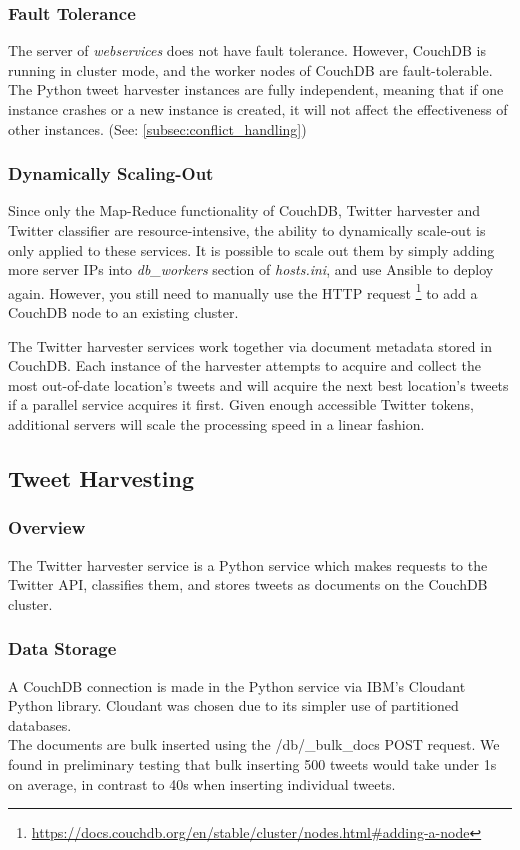 \documentclass[parskip=full, 11pt]{article}
\begin{document}
\subsubsection{Fault Tolerance}
The server of \emph{webservices} does not have fault tolerance. However, CouchDB is running in cluster mode, and the worker nodes of CouchDB are fault-tolerable. The Python tweet harvester instances are fully independent, meaning that if one instance crashes or a new instance is created, it will not affect the effectiveness of other instances. (See: \ref{subsec:conflict_handling})

\subsubsection{Dynamically Scaling-Out}

Since only the Map-Reduce functionality of CouchDB, Twitter harvester and Twitter classifier are resource-intensive, the ability to dynamically scale-out is only applied to these services. It is possible to scale out them by simply adding more server IPs into \emph{db\_workers} section of \emph{hosts.ini}, and use Ansible to deploy again. However, you still need to manually use the HTTP request \footnote{\url{https://docs.couchdb.org/en/stable/cluster/nodes.html\#adding-a-node}} to add a CouchDB node to an existing cluster.

The Twitter harvester services work together via document metadata stored in CouchDB. Each instance of the harvester attempts to acquire and collect the most out-of-date location's tweets and will acquire the next best location's tweets if a parallel service acquires it first. Given enough accessible Twitter tokens, additional servers will scale the processing speed in a linear fashion.

\subsection{Tweet Harvesting}

\subsubsection{Overview}
The Twitter harvester service is a Python service which makes requests to the Twitter API, classifies them, and stores tweets as documents on the CouchDB cluster.

\subsubsection{Data Storage}
A CouchDB connection is made in the Python service via IBM’s Cloudant Python library. Cloudant was chosen due to its simpler use of partitioned databases. \\
The documents are bulk inserted using the /{db}/\_bulk\_docs POST request. We found in preliminary testing that bulk inserting 500 tweets would take under 1s on average, in contrast to 40s when inserting individual tweets.
\end{document}
